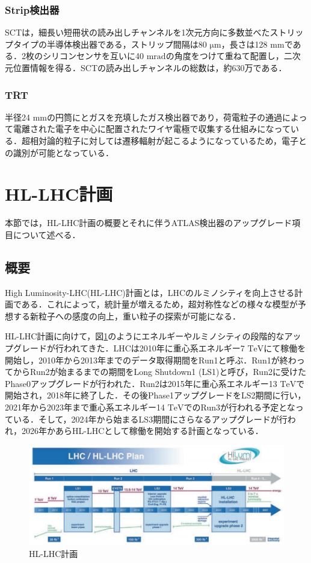 \subsubsection*{Strip検出器}
SCTは，細長い短冊状の読み出しチャンネルを1次元方向に多数並べたストリップタイプの半導体検出器である，ストリップ間隔は80 $\mathrm{\mu m}$，長さは128 $\mathrm{mm}$である．2枚のシリコンセンサを互いに40 $\mathrm{mrad}$の角度をつけて重ねて配置し，二次元位置情報を得る．SCTの読み出しチャンネルの総数は，約630万である．

\subsubsection*{TRT}
半径24 $\mathrm{mm}$の円筒にとガスを充填したガス検出器であり，荷電粒子の通過によって電離された電子を中心に配置されたワイヤ電極で収集する仕組みになっている．超相対論的粒子に対しては遷移輻射が起こるようになっているため，電子との識別が可能となっている．

\section{HL-LHC計画}
\label{sec:HL-LHC}
本節では，HL-LHC計画の概要とそれに伴うATLAS検出器のアップグレード項目について述べる．\par

\subsection{概要}
High Luminosity-LHC(HL-LHC)計画とは，LHCのルミノシティを向上させる計画である．これによって，統計量が増えるため，超対称性などの様々な模型が予想する新粒子への感度の向上，重い粒子の探索が可能になる．\par
HL-LHC計画に向けて，図\ref{fig:HL-LHC}のようにエネルギーやルミノシティの段階的なアップグレードが行われてきた．LHCは2010年に重心系エネルギー7 $\mathrm{TeV}$にて稼働を開始し，2010年から2013年までのデータ取得期間をRun1と呼ぶ．Run1が終わってからRun2が始まるまでの期間をLong Shutdown1 (LS1)と呼び，Run2に受けたPhase0アップグレードが行われた．Run2は2015年に重心系エネルギー13 $\mathrm{TeV}$で開始され，2018年に終了した．その後Phase1アップグレードをLS2期間に行い，2021年から2023年まで重心系エネルギー14 $\mathrm{TeV}$でのRun3が行われる予定となっている．そして，2024年から始まるLS3期間にさらなるアップグレードが行われ，2026年かあらHL-LHCとして稼働を開始する計画となっている．

\begin{figure}[h]
  \centering
  \includegraphics[width=15cm]{./figure/HL_LHC.png}
  \caption{HL-LHC計画\cite{Apollinari:2284929}}
  \label{fig:HL-LHC}
\end{figure}



